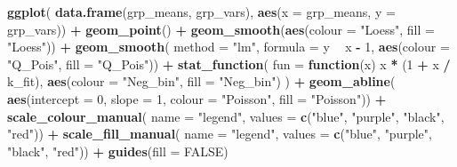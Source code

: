 \documentclass[
  12pt,
]{book}
\newenvironment{Shaded}{\begin{snugshade}}{\end{snugshade}}
\newcommand{\ControlFlowTok}[1]{\textcolor[rgb]{0.13,0.29,0.53}{\textbf{#1}}}
\newcommand{\DataTypeTok}[1]{\textcolor[rgb]{0.13,0.29,0.53}{#1}}
\newcommand{\DecValTok}[1]{\textcolor[rgb]{0.00,0.00,0.81}{#1}}
\newcommand{\KeywordTok}[1]{\textcolor[rgb]{0.13,0.29,0.53}{\textbf{#1}}}
\newcommand{\NormalTok}[1]{#1}
\newcommand{\OperatorTok}[1]{\textcolor[rgb]{0.81,0.36,0.00}{\textbf{#1}}}
\newcommand{\OtherTok}[1]{\textcolor[rgb]{0.56,0.35,0.01}{#1}}
\newcommand{\StringTok}[1]{\textcolor[rgb]{0.31,0.60,0.02}{#1}}
\begin{document}
\begin{Shaded}
\begin{Highlighting}[]
\KeywordTok{ggplot}\NormalTok{(}
  \KeywordTok{data.frame}\NormalTok{(grp_means, grp_vars),}
  \KeywordTok{aes}\NormalTok{(}\DataTypeTok{x =}\NormalTok{ grp_means, }\DataTypeTok{y =}\NormalTok{ grp_vars)) }\OperatorTok{+}
\StringTok{  }\KeywordTok{geom_point}\NormalTok{() }\OperatorTok{+}
\StringTok{  }\KeywordTok{geom_smooth}\NormalTok{(}\KeywordTok{aes}\NormalTok{(}\DataTypeTok{colour =} \StringTok{"Loess"}\NormalTok{, }\DataTypeTok{fill =} \StringTok{"Loess"}\NormalTok{)) }\OperatorTok{+}
\StringTok{  }\KeywordTok{geom_smooth}\NormalTok{(}
    \DataTypeTok{method =} \StringTok{"lm"}\NormalTok{, }\DataTypeTok{formula =}\NormalTok{ y }\OperatorTok{~}\StringTok{ }\NormalTok{x }\OperatorTok{-}\StringTok{ }\DecValTok{1}\NormalTok{,}
    \KeywordTok{aes}\NormalTok{(}\DataTypeTok{colour =} \StringTok{"Q_Pois"}\NormalTok{, }\DataTypeTok{fill =} \StringTok{"Q_Pois"}\NormalTok{)) }\OperatorTok{+}
\StringTok{  }\KeywordTok{stat_function}\NormalTok{(}
    \DataTypeTok{fun =} \ControlFlowTok{function}\NormalTok{(x) x }\OperatorTok{*}\StringTok{ }\NormalTok{(}\DecValTok{1} \OperatorTok{+}\StringTok{ }\NormalTok{x }\OperatorTok{/}\StringTok{ }\NormalTok{k_fit),}
    \KeywordTok{aes}\NormalTok{(}\DataTypeTok{colour =} \StringTok{"Neg_bin"}\NormalTok{, }\DataTypeTok{fill =} \StringTok{"Neg_bin"}\NormalTok{)}
\NormalTok{  ) }\OperatorTok{+}
\StringTok{  }\KeywordTok{geom_abline}\NormalTok{(}
    \KeywordTok{aes}\NormalTok{(}\DataTypeTok{intercept =} \DecValTok{0}\NormalTok{, }\DataTypeTok{slope =} \DecValTok{1}\NormalTok{, }\DataTypeTok{colour =} \StringTok{"Poisson"}\NormalTok{, }\DataTypeTok{fill =} \StringTok{"Poisson"}\NormalTok{)) }\OperatorTok{+}
\StringTok{  }\KeywordTok{scale_colour_manual}\NormalTok{(}
    \DataTypeTok{name =} \StringTok{"legend"}\NormalTok{,}
    \DataTypeTok{values =} \KeywordTok{c}\NormalTok{(}\StringTok{"blue"}\NormalTok{, }\StringTok{"purple"}\NormalTok{, }\StringTok{"black"}\NormalTok{, }\StringTok{"red"}\NormalTok{)) }\OperatorTok{+}
\StringTok{  }\KeywordTok{scale_fill_manual}\NormalTok{(}
    \DataTypeTok{name =} \StringTok{"legend"}\NormalTok{,}
    \DataTypeTok{values =} \KeywordTok{c}\NormalTok{(}\StringTok{"blue"}\NormalTok{, }\StringTok{"purple"}\NormalTok{, }\StringTok{"black"}\NormalTok{, }\StringTok{"red"}\NormalTok{)) }\OperatorTok{+}
\StringTok{  }\KeywordTok{guides}\NormalTok{(}\DataTypeTok{fill =} \OtherTok{FALSE}\NormalTok{)}
\end{Highlighting}
\end{Shaded}
\end{document}

